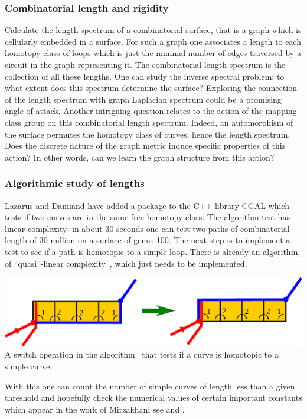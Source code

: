 \documentclass[14pt,fleqn]{article}
\begin{document}
\subsubsection{Combinatorial length and rigidity}
 Calculate the length
spectrum of a combinatorial surface, that is a graph which is
cellularly embedded in a surface.  For such a graph one associates a
length to each homotopy class of loops which is just the minimal
number of edges traversed by a circuit in the graph representing
it. The combinatorial length spectrum is the collection of all these
lengths. One can study the inverse spectral problem: to what extent
does this spectrum determine the surface? Exploring the connection of the length spectrum with graph Laplacian spectrum could be a promising angle of attack. Another intriguing question relates to the action of the mapping class group on this combinatorial length spectrum. Indeed, an automorphism of the
 surface permutes the homotopy class of curves, hence the length spectrum. Does the discrete nature of the graph metric induce specific properties of this action? In other words, can we learn the graph structure from this action?

\subsubsection{Algorithmic study of lengths}
\label{algo lengths}
Lazarus and Damiand have
added a package to the C++ library  CGAL which tests if two curves are
in the same free homotopy class. The algorithm test has linear
complexity: in about 30 seconds one can test two paths of
combinatorial length of 30 million on a surface of genus
100. The next step is to implement a test to see if a path
is homotopic to a simple loop. There is already an algorithm, of
“quasi”-linear complexity~\cite{dl-cginc-19}, which just needs to be implemented.
\begin{center}
  \includegraphics[scale=.55]{switch.pdf} \\
  {\small A switch operation in the algorithm~\cite{dl-cginc-19} that tests if a curve is homotopic to a simple curve.}
\end{center}
With
this one can count the number of simple curves of length less than a given threshold 
and hopefully check the numerical values of certain important constants which
appear in the work of Mirzakhani see
\cite{m-gnscg-08} and \cite{m-cmcgo-16}.
\end{document}

